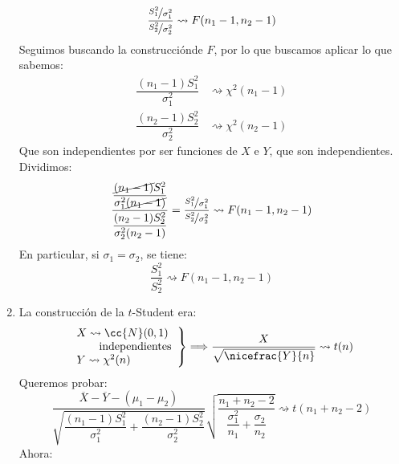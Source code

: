 \begin{coro}
\begin{enumerate}
            \begin{equation*}
                \dfrac{\nicefrac{S_1^2}{\sigma_1^2}}{\nicefrac{S_2^2}{\sigma_2^2}} \rightsquigarrow F(n_1-1,n_2-1)
            \end{equation*}
            Seguimos buscando la construcciónde $F$, por lo que buscamos aplicar lo que sabemos:
            \begin{align*}
                \dfrac{(n_1-1)S_1^2}{\sigma_1^2} &\rightsquigarrow\chi^2(n_1-1) \\
                \dfrac{(n_2-1)S_2^2}{\sigma_2^2} &\rightsquigarrow\chi^2(n_2-1)
            \end{align*}
            Que son independientes por ser funciones de $X$ e $Y$, que son independientes. Dividimos:
            \begin{equation*}
                \dfrac{\dfrac{\cancel{(n_1-1)}S_1^2}{\sigma_1^2\cancel{(n_1-1)}}}{\dfrac{(n_2-1)S_2^2}{\sigma_2^2(n_2-1)}} = \dfrac{\nicefrac{S_1^2}{\sigma_1^2}}{\nicefrac{S_2^2}{\sigma_2^2}} \rightsquigarrow F(n_1-1,n_2-1)
            \end{equation*}
        En particular, si $\sigma_1 = \sigma_2$, se tiene:
            \begin{equation*}
                \dfrac{S_1^2}{S_2^2}\rightsquigarrow F(n_1-1,n_2-1)
            \end{equation*}
        \item La construcción de la $t$-Student era:
            \begin{equation*}
                \left.\begin{array}{l}
                        X \rightsquigarrow \cc{N}(0,1) \\
                        \qquad \text{independientes} \\
                        Y\rightsquigarrow\chi^2(n)
                \end{array}\right\} \Longrightarrow \dfrac{X}{\sqrt{\nicefrac{Y}{n}}} \rightsquigarrow t(n)
            \end{equation*}
            Queremos probar:
            \begin{equation*}
                \dfrac{\overline{X}-\overline{Y}-(\mu_1-\mu_2)}{\sqrt{\dfrac{(n_1-1)S_1^2}{\sigma_1^2} + \dfrac{(n_2-1)S_2^2}{\sigma_2^2}}} \sqrt{\dfrac{n_1+n_2-2}{\dfrac{\sigma_1^2}{n_1}+\dfrac{\sigma_2}{n_2}}} \rightsquigarrow t(n_1+n_2-2)
            \end{equation*}
            Ahora:
            \begin{equation*}

\end{equation*}
\end{enumerate}
\end{coro}
